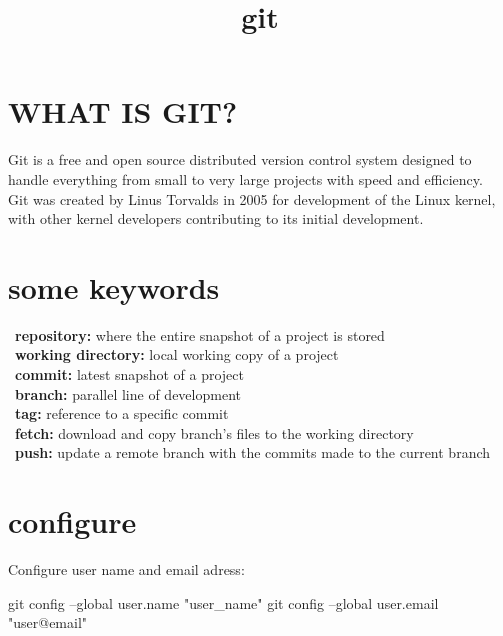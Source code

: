 \documentclass{refcard}
\title{git}
\begin{document}
\maketitle

\section{WHAT IS GIT?}

Git is a free and open source distributed version control system designed to handle everything from small to very large projects with speed and efficiency.\\

Git was created by Linus Torvalds in 2005 for development of the Linux kernel, with other kernel developers contributing to its initial development.\\

\section{some keywords}

\textbullet\ \textbf{repository:} where the entire snapshot of a project is stored\\
\textbullet\ \textbf{working directory:} local working copy of a project\\
\textbullet\ \textbf{commit:} latest snapshot of a project\\
\textbullet\ \textbf{branch:} parallel line of development\\
\textbullet\ \textbf{tag:} reference to a specific commit\\
\textbullet\ \textbf{fetch:} download and copy branch’s files to the working directory\\
\textbullet\ \textbf{push:} update a remote branch with the commits made to the current branch\\

\section{configure}

Configure user name and email adress:
\begin{ttyenv}
git config --global user.name "user_name"
git config --global user.email "user@email"
\end{ttyenv}
\end{document}
